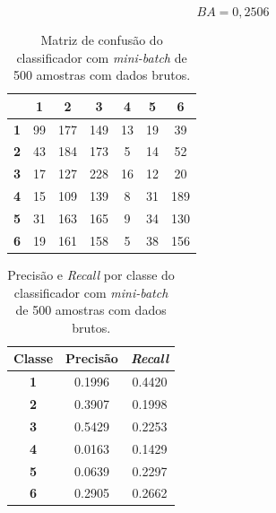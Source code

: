 \begin{equation}\label{eq:ba_lr_500_raw}
BA = 0,2506
\end{equation}

\begin{table}[H]
	\centering
\begin{tabular}{c||c|c|c|c|c|c|}
	\cline{2-7}
	\textbf{}                        & \textbf{1} & \textbf{2} & \textbf{3} & \textbf{4} & \textbf{5} & \textbf{6} \\ \hline \hline
	\multicolumn{1}{|c||}{\textbf{1}} & 99         & 177        & 149        & 13         & 19         & 39         \\ \hline
	\multicolumn{1}{|c||}{\textbf{2}} & 43         & 184        & 173        & 5          & 14         & 52         \\ \hline
	\multicolumn{1}{|c||}{\textbf{3}} & 17         & 127        & 228        & 16         & 12         & 20         \\ \hline
	\multicolumn{1}{|c||}{\textbf{4}} & 15         & 109        & 139        & 8          & 31         & 189        \\ \hline
	\multicolumn{1}{|c||}{\textbf{5}} & 31         & 163        & 165        & 9          & 34         & 130        \\ \hline
	\multicolumn{1}{|c||}{\textbf{6}} & 19         & 161        & 158        & 5          & 38         & 156        \\ \hline
\end{tabular}
	\caption{Matriz de confusão do classificador com \textit{mini-batch} de 500 amostras com dados brutos.}
	\label{tab:mc_lr_500_raw}
\end{table}

\begin{table}[H]
	\centering
\begin{tabular}{c|c|c}
	\textbf{Classe}     & \textbf{Precisão} & \textbf{\textit{Recall}} \\ \hline
	\textbf{1} & 0.1996            & 0.4420          \\
	\textbf{2} & 0.3907            & 0.1998          \\
	\textbf{3} & 0.5429            & 0.2253          \\
	\textbf{4} & 0.0163            & 0.1429          \\
	\textbf{5} & 0.0639            & 0.2297          \\
	\textbf{6} & 0.2905            & 0.2662          \\
\end{tabular}
	\caption{Precisão e \textit{Recall} por classe do classificador com \textit{mini-batch} de  500 amostras com dados brutos.}
	\label{tab:pr_lr_500_raw}
\end{table}



